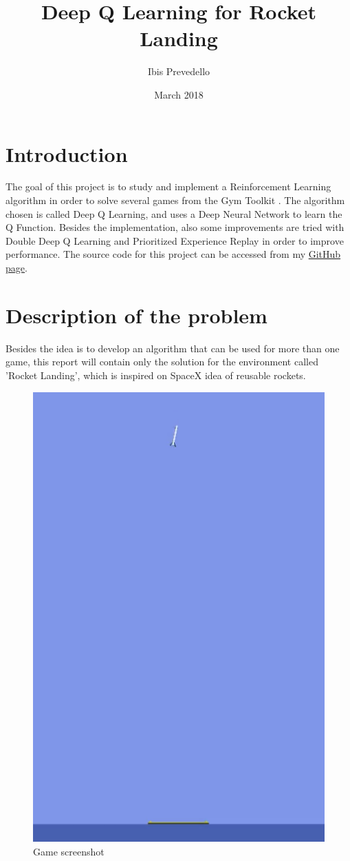 \documentclass{article}
\title{Deep Q Learning for Rocket Landing}
\date{March 2018}
\author{Ibis Prevedello}
\begin{document}
\maketitle

\section{Introduction}
The goal of this project is to study and implement a Reinforcement Learning algorithm in order to solve several games from the Gym Toolkit \cite{gym}. The algorithm chosen is called Deep Q Learning, and uses a Deep Neural Network to learn the Q Function. Besides the implementation, also some improvements are tried with Double Deep Q Learning and Prioritized Experience Replay in order to improve performance. The source code for this project can be accessed from my \href{https://github.com/ibiscp/Rocket-Lander}{GitHub page}.

\section{Description of the problem}
Besides the idea is to develop an algorithm that can be used for more than one game, this report will contain only the solution for the environment called 'Rocket Landing', which is inspired on SpaceX idea of reusable rockets.

\begin{figure}[!ht]
\centering
\includegraphics[scale=0.30]{environment}
\caption{Game screenshot}
\label{fig:fig1}
\end{figure}
\end{document}
